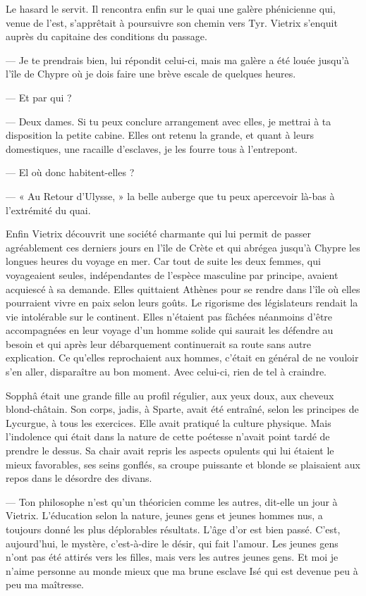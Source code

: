 \documentclass[a4paper, 11pt, oneside, polutonikogreek, french]{article}
\begin{document}
Le hasard le servit. Il rencontra enfin sur le quai une galère phénicienne qui, venue de l'est, s'apprêtait à poursuivre son chemin vers Tyr. Vietrix s'enquit auprès du capitaine des conditions du passage.

--- Je te prendrais bien, lui répondit celui-ci, mais ma galère a été louée jusqu'à l'île de Chypre où je dois faire une brève escale de quelques heures.

--- Et par qui ?

--- Deux dames. Si tu peux conclure arrangement avec elles, je mettrai à ta disposition la petite cabine. Elles ont retenu la grande, et quant à leurs domestiques, une racaille d'esclaves, je les fourre tous à l'entrepont.

--- El où donc habitent-elles ?

--- « Au Retour d'Ulysse, » la belle auberge que tu peux apercevoir là-bas à l'extrémité du quai.

Enfin Vietrix découvrit une société charmante qui lui permit de passer agréablement ces derniers jours en l'île de Crète et qui abrégea jusqu'à Chypre les longues heures du voyage en mer. Car tout de suite les deux femmes, qui voyageaient seules, indépendantes de l'espèce masculine par principe, avaient acquiescé à sa demande. Elles quittaient Athènes pour se rendre dans l'île où elles pourraient vivre en paix selon leurs goûts. Le rigorisme des législateurs rendait la vie intolérable sur le continent. Elles n'étaient pas fâchées néanmoins d'être accompagnées en leur voyage d'un homme solide qui saurait les défendre au besoin et qui après leur débarquement continuerait sa route sans autre explication. Ce qu'elles reprochaient aux hommes, c'était en général de ne vouloir s'en aller, disparaître au bon moment. Avec celui-ci, rien de tel à craindre.

\bigskip
\centerline{\EightStarTaper}
\centerline{\EightStarTaper\EightStarTaper}
\bigskip

Sopphâ était une grande fille au profil régulier, aux yeux doux, aux cheveux blond-châtain. Son corps, jadis, à Sparte, avait été entraîné, selon les principes de Lycurgue, à tous les exercices. Elle avait pratiqué la culture physique. Mais l'indolence qui était dans la nature de cette poétesse n'avait point tardé de prendre le dessus. Sa chair avait repris les aspects opulents qui lui étaient le mieux favorables, ses seins gonflés, sa croupe puissante et blonde se plaisaient aux repos dans le désordre des divans.

--- Ton philosophe n'est qu'un théoricien comme les autres, dit-elle un jour à Vietrix. L'éducation selon la nature, jeunes gens et jeunes hommes nus, a toujours donné les plus déplorables résultats. L'âge d'or est bien passé. C'est, aujourd'hui, le mystère, c'est-à-dire le désir, qui fait l'amour. Les jeunes gens n'ont pas été attirés vers les filles, mais vers les autres jeunes gens. Et moi je n'aime personne au monde mieux que ma brune esclave Isé qui est devenue peu à peu ma maîtresse.
\end{document}
